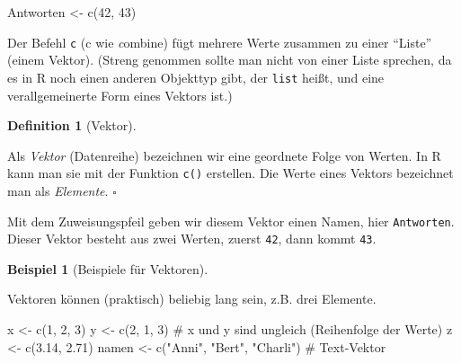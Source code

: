 \documentclass[
  letterpaper,
]{scrbook}
\newenvironment{Shaded}{\begin{snugshade}}{\end{snugshade}}
\newcommand{\CommentTok}[1]{\textcolor[rgb]{0.37,0.37,0.37}{#1}}
\newcommand{\DecValTok}[1]{\textcolor[rgb]{0.68,0.00,0.00}{#1}}
\newcommand{\FloatTok}[1]{\textcolor[rgb]{0.68,0.00,0.00}{#1}}
\newcommand{\FunctionTok}[1]{\textcolor[rgb]{0.28,0.35,0.67}{#1}}
\newcommand{\NormalTok}[1]{\textcolor[rgb]{0.00,0.23,0.31}{#1}}
\newcommand{\OtherTok}[1]{\textcolor[rgb]{0.00,0.23,0.31}{#1}}
\newcommand{\StringTok}[1]{\textcolor[rgb]{0.13,0.47,0.30}{#1}}
\theoremstyle{definition}
\newtheorem{example}{Beispiel}[chapter]
\theoremstyle{definition}
\newtheorem{definition}{Definition}[chapter]
\theoremstyle{definition}
\theoremstyle{remark}
\begin{document}
\begin{Shaded}
\begin{Highlighting}[]
\NormalTok{Antworten }\OtherTok{\textless{}{-}} \FunctionTok{c}\NormalTok{(}\DecValTok{42}\NormalTok{, }\DecValTok{43}\NormalTok{)}
\end{Highlighting}
\end{Shaded}

Der Befehl \texttt{c} (c wie \emph{c}ombine) fügt mehrere Werte zusammen
zu einer ``Liste'' (einem Vektor). (Streng genommen sollte man nicht von
einer Liste sprechen, da es in R noch einen anderen Objekttyp gibt, der
\texttt{list} heißt, und eine verallgemeinerte Form eines Vektors ist.)

\begin{definition}[Vektor]\protect\hypertarget{def-vektor}{}\label{def-vektor}

Als \emph{Vektor} (Datenreihe) bezeichnen wir eine geordnete Folge von
Werten. In R kann man sie mit der Funktion \texttt{c()} erstellen. Die
Werte eines Vektors bezeichnet man als \emph{Elemente}. \(\square\)

\end{definition}

Mit dem Zuweisungspfeil geben wir diesem Vektor einen Namen, hier
\texttt{Antworten}. Dieser Vektor besteht aus zwei Werten, zuerst
\texttt{42}, dann kommt \texttt{43}.

\begin{example}[Beispiele für
Vektoren]\protect\hypertarget{exm-vektoren}{}\label{exm-vektoren}

Vektoren können (praktisch) beliebig lang sein, z.B. drei Elemente.

\begin{Shaded}
\begin{Highlighting}[]
\NormalTok{x }\OtherTok{\textless{}{-}} \FunctionTok{c}\NormalTok{(}\DecValTok{1}\NormalTok{, }\DecValTok{2}\NormalTok{, }\DecValTok{3}\NormalTok{)}
\NormalTok{y }\OtherTok{\textless{}{-}} \FunctionTok{c}\NormalTok{(}\DecValTok{2}\NormalTok{, }\DecValTok{1}\NormalTok{, }\DecValTok{3}\NormalTok{)  }\CommentTok{\# x und y sind ungleich (Reihenfolge der Werte)}
\NormalTok{z }\OtherTok{\textless{}{-}} \FunctionTok{c}\NormalTok{(}\FloatTok{3.14}\NormalTok{, }\FloatTok{2.71}\NormalTok{)  }
\NormalTok{namen }\OtherTok{\textless{}{-}} \FunctionTok{c}\NormalTok{(}\StringTok{"Anni"}\NormalTok{, }\StringTok{"Bert"}\NormalTok{, }\StringTok{"Charli"}\NormalTok{) }\CommentTok{\# Text{-}Vektor}
\end{Highlighting}
\end{Shaded}

\end{example}
\end{document}
